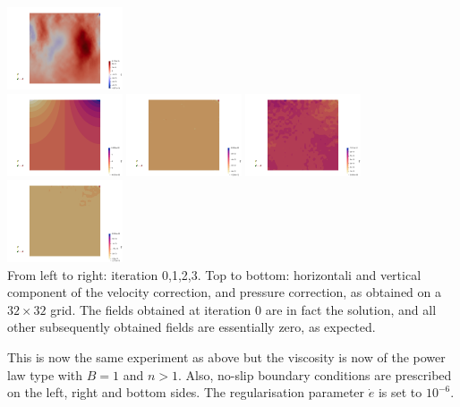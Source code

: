 \begin{center}
\includegraphics[width=3.4cm]{python_codes/fieldstone_87/results/experiment_00/dv_03}\\
\includegraphics[width=3.4cm]{python_codes/fieldstone_87/results/experiment_00/dp_00}
\includegraphics[width=3.4cm]{python_codes/fieldstone_87/results/experiment_00/dp_01}
\includegraphics[width=3.4cm]{python_codes/fieldstone_87/results/experiment_00/dp_02}
\includegraphics[width=3.4cm]{python_codes/fieldstone_87/results/experiment_00/dp_03}\\
{\captionfont From left to right: iteration 0,1,2,3. 
Top to bottom: horizontali and vertical component of the velocity correction, 
and pressure correction, as obtained on a $32\times 32$ grid. The fields obtained at iteration 0 
are in fact the solution, and all other subsequently obtained fields 
are essentially zero, as expected.}
\end{center}

This is now the same experiment as above but the viscosity is now of the 
power law type with $B=1$ and $n>1$. Also, no-slip boundary conditions 
are prescribed on the left, right and bottom sides. 
The regularisation parameter $\dot{e}$ is set to $10^{-6}$.

